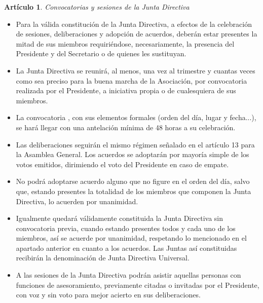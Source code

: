 \documentclass[a4paper,12pt]{article}
\theoremstyle{mystyle}		%
\newtheorem{art}{Artículo}	%
\begin{document}
\begin{onehalfspace}
\begin{art}
Convocatorias y sesiones de la Junta Directiva
\end{art}
\begin{itemize}
\item [1.-] Para la válida constitución de la Junta Directiva, a efectos de la celebración de sesiones, deliberaciones y adopción de acuerdos, deberán estar presentes la mitad de sus miembros requiriéndose, necesariamente, la presencia del Presidente y del Secretario o de quienes les sustituyan.
\item [2.-] La Junta Directiva se reunirá, al menos, una vez al trimestre y cuantas veces como sea preciso para la buena marcha de la Asociación, por convocatoria realizada por el Presidente, a iniciativa propia o de cualesquiera de sus miembros.
\item [3.-] La convocatoria , con sus elementos formales (orden del día, lugar y fecha...), se hará llegar con una antelación mínima de 48 horas a su celebración.
\item [4.-] Las deliberaciones seguirán el mismo régimen señalado en el artículo 13 para la Asamblea General. Los acuerdos se adoptarán por mayoría simple de los votos emitidos, dirimiendo el voto del Presidente en caso de empate.
\item [5.-] No podrá adoptarse acuerdo alguno que no figure en el orden del día, salvo que, estando presentes la totalidad de los miembros que componen la Junta Directiva, lo acuerden por unanimidad.
\item [6.-] Igualmente quedará válidamente constituida la Junta Directiva sin convocatoria previa, cuando estando presentes todos y cada uno de los miembros, así se acuerde por unanimidad, respetando lo mencionado en el apartado anterior en cuanto a los acuerdos. Las Juntas así constituidas recibirán la denominación de Junta Directiva Universal.
\item [7.-] A las sesiones de la Junta Directiva podrán asistir aquellas personas con funciones de asesoramiento, previamente citadas o invitadas por el Presidente, con voz y sin voto para mejor acierto en sus deliberaciones.
\end{itemize}


\end{onehalfspace}
\end{document}
